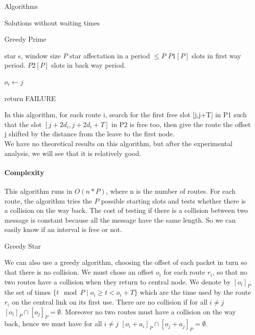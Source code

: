 \documentclass[a4paper,10pt]{report}
\begin{document}
\begin{chapter}{Algorithms}
\begin{section}{Solutions without waiting times}
\begin{subsection}{Greedy Prime}
\begin{algorithm}[H]
\caption{Greedy Prime assignment}
\begin{algorithmic}
\REQUIRE star s, window size $P$
\ENSURE star affectation in a period $\leq P$ 
\STATE $P1[P]$ slots in first way period.
\STATE $P2[P]$ slots in back way period.




\STATE $o_i \leftarrow j$
\ENDIF

\ENDIF
{}
\STATE return FAILURE
\ENDIF
\ENDFOR

\ENDFOR

\end{algorithmic}
\end{algorithm}


In this algorithm, for each route i, search for the first free slot [j,j+T] in P1 such that the slot $[j + 2d_i,j + 2d_i+T]$ in P2 is free too,
then give the route the offset j shifted by the distance from the leave to the first node.\\

We have no theoretical results on this algorithm, but after the experimental analysis, we will see that it is relatively good.


\paragraph{Complexity}
This algorithm runs in $O(n*P)$, where n is the number of routes. For each route, the algorithm tries the $P$ possible
starting slots and tests whether there is a collision on the way back.
The cost of testing if there is a collision between two message is constant because all the message have the same length. So we can easily know if an interval is free or not.

\end{subsection}




\begin{subsection}{Greedy Star}
 

We can also use a greedy algorithm, choosing the offset of each packet in turn so that there is no collision. 
We must chose an offset $o_i$ for each route $r_i$, so that no two routes have a collision when they return to central node.  
We denote by $[o_i]_P$ the set of times $\{ t \mod P \mid o_i \geq t < o_i + T \}$ which are the time used by the route $r_i$ on the central
link on its first use. There are no collision if for all $i\neq j$
 $[o_i]_P \cap [o_j]_P = \emptyset$. Moreover no two routes must have a collision on the way back, hence we must have for all $i\neq j$
 $[o_i + a_i]_P \cap [o_j + a_j]_P = \emptyset$.
 

\end{subsection}
\end{section}
\end{chapter}
\end{document}
